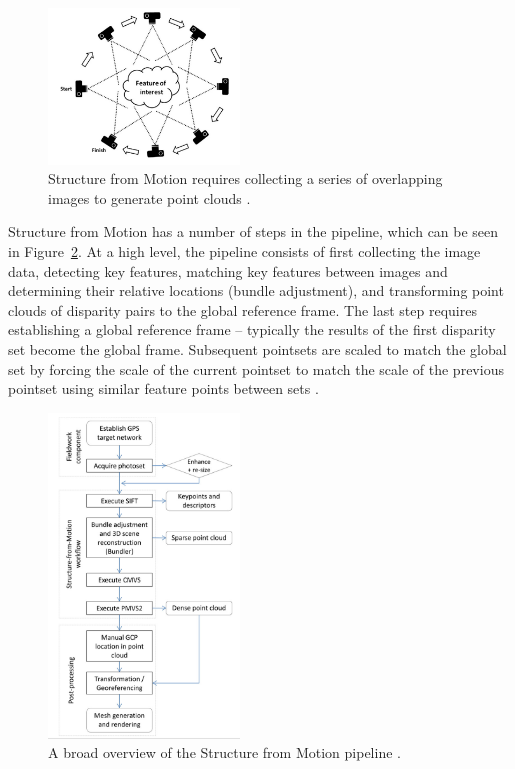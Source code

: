 \documentclass[12pt]{drexelthesis}
\begin{document}
\begin{figure}[!ht]
	\centering
	\includegraphics[width=2in]{instruments/sfmimagecollection.png}
	\caption[Structure from Motion collection method]{\centering Structure from Motion requires collecting a series of overlapping images to generate point clouds \cite{WESTOBY2012300}.}
	\label{sfm:imageoverlap}
\end{figure}

Structure from Motion has a number of steps in the pipeline, which can be seen in Figure~\ref{sfm:pipeline}. At a high level, the pipeline consists of first collecting the image data, detecting key features, matching key features between images and determining their relative locations (bundle adjustment), and transforming point clouds of disparity pairs to the global reference frame. The last step requires establishing a global reference frame -- typically the results of the first disparity set become the global frame. Subsequent pointsets are scaled to match the global set by forcing the scale of the current pointset to match the scale of the previous pointset using similar feature points between sets \cite{WESTOBY2012300}.

\begin{figure}[!ht]
	\centering
	\includegraphics[width=2in]{instruments/sfmpipeline.png}
	\caption[Structure from Motion algorithm pipeline]{\centering A broad overview of the Structure from Motion pipeline \cite{WESTOBY2012300}.}
	\label{sfm:pipeline}
\end{figure}
\end{document}
